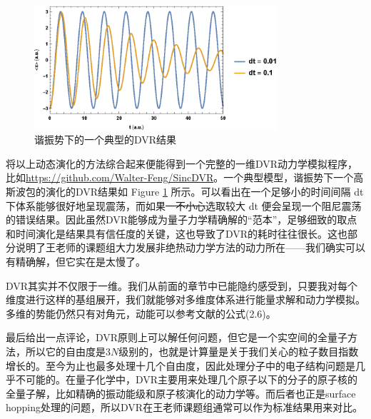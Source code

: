\documentclass[12pt,a4paper,openany,twoside]{book}
\numberwithin{equation}{section}
\begin{document}
        \begin{figure}[h]
          \centering
          \includegraphics[width=0.8\textwidth]{fig/DVRtest.eps}
          \caption{谐振势下的一个典型的DVR结果}
          \label{DVRresult}
        \end{figure}

        将以上动态演化的方法综合起来便能得到一个完整的一维DVR动力学模拟程序，比如\url{https://github.com/Walter-Feng/SincDVR}。一个典型模型，谐振势下一个高斯波包的演化的DVR结果如 Figure \ref{DVRresult} 所示。可以看出在一个足够小的时间间隔 dt 下体系能够很好地呈现震荡，而如果\sout{一不小心}选取较大 dt 便会呈现一个阻尼震荡的错误结果。因此虽然DVR能够成为量子力学精确解的``范本''，足够细致的取点和时间演化是结果具有信任度的关键，这也导致了DVR的耗时往往很长。这也部分说明了王老师的课题组大力发展非绝热动力学方法的动力所在——我们确实可以有精确解，但它实在是太慢了。

        DVR其实并不仅限于一维。我们从前面的章节中已能隐约感受到，只要我对每个维度进行这样的基组展开，我们就能够对多维度体系进行能量求解和动力学模拟。多维的势能仍然只有对角元，动能可以参考文献\cite{colbert1992novel}的公式(2.6)。

        最后给出一点评论，DVR原则上可以解任何问题，但它是一个实空间的全量子方法，所以它的自由度是$3N$级别的，也就是计算量是关于我们关心的粒子数目指数增长的。至今为止也最多处理十几个自由度，因此处理分子中的电子结构问题是几乎不可能的。在量子化学中，DVR主要用来处理几个原子以下的分子的原子核的全量子解，比如精确的振动能级和原子核演化的动力学等。而后者也正是surface hopping处理的问题，所以DVR在王老师课题组通常可以作为标准结果用来对比。
\end{document}
